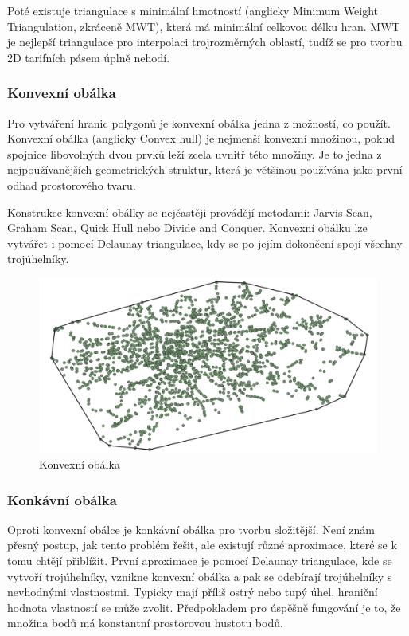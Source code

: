Poté existuje triangulace s minimální hmotností (anglicky Minimum Weight Triangulation, zkráceně MWT),
která má minimální celkovou délku hran. MWT je nejlepší triangulace pro interpolaci trojrozměrných oblastí,
tudíž se pro tvorbu 2D tarifních pásem úplně nehodí.

\subsubsection{Konvexní obálka}
\label{konv_obalka}

Pro vytváření hranic polygonů je konvexní obálka jedna z možností, co použít. Konvexní obálka (anglicky Convex hull)
je nejmenší konvexní množinou, pokud spoj\-nice  libovolných dvou prvků leží zcela uvnitř této množiny.
Je to jedna z nejpoužívanějších geometrických struktur, která je většinou používána jako první odhad
prostorového tvaru.

Konstrukce konvexní obálky se nejčastěji provádějí metodami: Jarvis Scan, Graham Scan, Quick Hull nebo
Divide and Conquer. Konvexní obálku lze vytvářet i pomocí Delaunay triangulace, kdy se po jejím dokončení
spojí všechny trojúhelníky.

\begin{figure}[H] \centering
    \includegraphics[width=400pt]{./pictures/convexHull.png}
    \caption[Konvexní obálka]{Konvexní obálka}
	\label{fig:convexHull}              
\end{figure}

\subsubsection{Konkávní obálka}
\label{konk_obalka}
 
Oproti konvexní obálce je konkávní obálka pro tvorbu složitější. Není znám přesný postup,
jak tento problém řešit, ale existují různé aproximace, které se k tomu chtějí přiblížit.
První aproximace je pomocí Delaunay triangulace, kde se vytvoří trojúhelníky, vznikne
konvexní obálka a pak se odebírají trojúhelníky s nevhodnými vlastnostmi. Typicky mají příliš ostrý nebo tupý
úhel, hraniční hodnota vlastností se může zvolit.
Předpokladem pro úspěšně fungování je to, že množina bodů má konstantní
prostorovou hustotu bodů.

